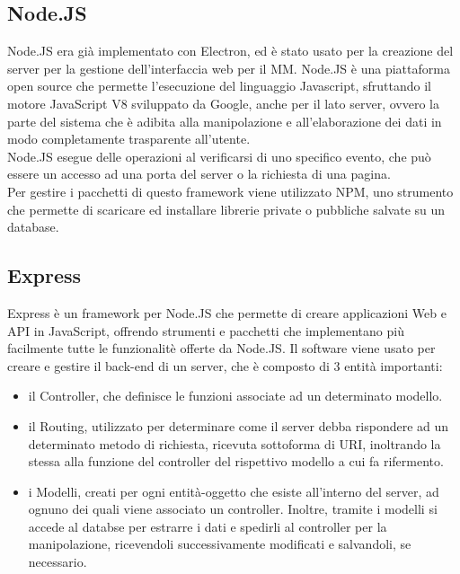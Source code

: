 \subsection{Node.JS}
Node.JS era gi\`a implementato con Electron, ed \`e stato usato per la creazione del server
per la gestione dell'interfaccia web per il MM.
Node.JS \`e una piattaforma open source che permette l'esecuzione del linguaggio Javascript, sfruttando il motore JavaScript V8 sviluppato da Google,
anche per il lato server, ovvero
la parte del sistema che \`e adibita alla manipolazione e all'elaborazione
dei dati in modo completamente trasparente all'utente.\\
Node.JS esegue delle operazioni al verificarsi di uno specifico evento, che pu\`o essere un accesso ad una porta
del server o la richiesta di una pagina.\\
Per gestire i pacchetti di questo framework viene utilizzato NPM\cite{NPM}, uno strumento che permette
di scaricare ed installare librerie private o pubbliche salvate su un database.
\\[1\baselineskip]

\subsection{Express}\label{cap:express}
Express \`e un framework per Node.JS che permette di creare applicazioni Web e API in JavaScript, offrendo strumenti e pacchetti
che implementano pi\`u facilmente tutte le funzionalit\`e offerte da Node.JS.
Il software viene usato per creare e gestire il back-end di un server, che \`e composto di 3 entit\`a importanti:
\begin{itemize}
\item il Controller, che definisce le funzioni associate ad un determinato modello.
\item il Routing, utilizzato per determinare come il server debba rispondere ad un determinato metodo di richiesta,
ricevuta sottoforma di URI, inoltrando la stessa alla funzione del controller del rispettivo modello a cui fa rifermento.
\item i Modelli, creati per ogni entit\`a-oggetto che esiste all'interno del server, ad ognuno dei quali viene associato
un controller. Inoltre, tramite i modelli si accede al databse per estrarre i dati e spedirli al controller per
la manipolazione, ricevendoli successivamente modificati e salvandoli, se necessario.
\\[2\baselineskip]
\end{itemize}

